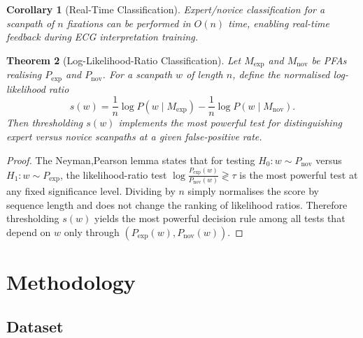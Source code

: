 \documentclass[sigconf]{acmart}
\theoremstyle{plain}
\newtheorem{theorem}{Theorem}
\newtheorem{corollary}[theorem]{Corollary}
\theoremstyle{definition}
\begin{document}
\begin{corollary}[Real-Time Classification]
Expert/novice classification for a scanpath of $n$ fixations can be performed in $O(n)$ time, enabling real-time feedback during ECG interpretation training.
\end{corollary}

\begin{theorem}[Log-Likelihood-Ratio Classification]
\label{thm:llr}
Let $M_{\text{exp}}$ and $M_{\text{nov}}$ be PFAs realising $P_{\text{exp}}$ and $P_{\text{nov}}$.
For a scanpath $w$ of length $n$, define the normalised log-likelihood ratio
\[
s(w) = \frac{1}{n}\log P(w \mid M_{\text{exp}})
       - \frac{1}{n}\log P(w \mid M_{\text{nov}}).
\]
Then thresholding $s(w)$ implements the most powerful test for distinguishing expert versus novice scanpaths at a given false-positive rate.
\end{theorem}

\begin{proof}
The Neyman,Pearson lemma states that for testing $H_0: w \sim P_{\text{nov}}$ versus $H_1: w \sim P_{\text{exp}}$, the likelihood-ratio test $\log\frac{P_{\text{exp}}(w)}{P_{\text{nov}}(w)} \gtrless \tau$ is the most powerful test at any fixed significance level.
Dividing by $n$ simply normalises the score by sequence length and does not change the ranking of likelihood ratios.
Therefore thresholding $s(w)$ yields the most powerful decision rule among all tests that depend on $w$ only through $(P_{\text{exp}}(w), P_{\text{nov}}(w))$.
\end{proof}

\section{Methodology}
\label{sec:methodology}

\subsection{Dataset}
\end{document}
